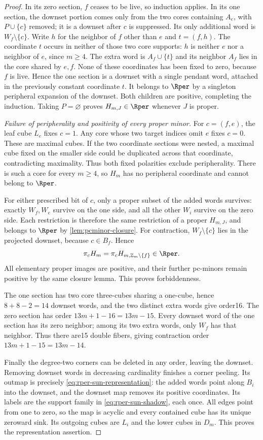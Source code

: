 \begin{proof}
In its zero section, $f$ ceases to be live, so induction applies.
In its one section, the downset portion comes only from the two cores
containing $A_e$, with $P\cup\{c\}$ removed; it is a downset after
$c$ is suppressed. Its only additional word is $W_f\setminus\{c\}$.
Write $h$ for the neighbor of $f$ other than $e$ and $t=(f,h)$.
The coordinate $t$ occurs in neither of those two core supports: $h$ is
neither $e$ nor a neighbor of $e$, since $m\ge4$.
The extra word is $A_f\cup\{t\}$ and its neighbor $A_f$ lies in the
core shared by $e,f$. None of these coordinates has been fixed to zero,
because $f$ is live. Hence the one section is a downset with a single
pendant word, attached in the previously constant coordinate $t$.
It belongs to $\Rper$ by a singleton peripheral expansion of the
downset. Both children are positive, completing the induction.
Taking $P=\varnothing$ proves $H_{m,J}\in\Rper$ whenever $J$ is proper.

\emph{Failure of peripherality and positivity of every proper minor.}
For $c=(f,e)$, the leaf cube $L_e$ fixes $c=1$. Any core whose two target
indices omit $e$ fixes $c=0$. These are maximal cubes.
If the two coordinate sections were nested, a maximal cube fixed on
the smaller side could be duplicated across that coordinate, contradicting
maximality. Thus both fixed polarities exclude peripherality.
There is such a core for every $m\ge4$, so $H_m$ has no peripheral
coordinate and cannot belong to $\Rper$.

For either prescribed bit of $c$, only a proper subset of the added
words survives: exactly $W_f,W_e$ survive on the one side, and all the
other $W_i$ survive on the zero side. Each restriction is therefore the
same restriction of a proper $H_{m,J}$, and belongs to $\Rper$ by
\cref{lem:pcminor-closure}.
For contraction, $W_f\setminus\{c\}$ lies in the projected downset,
because $c\in B_f$. Hence
\[
 \pi_c H_m=\pi_c H_{m,\mathbb Z_m\setminus\{f\}}\in\Rper.
\]
All elementary proper images are positive, and their further pc-minors
remain positive by the same closure lemma. This proves forbiddenness.

The one section has two core three-cubes sharing a one-cube, hence
$8+8-2=14$ downset words, and the two distinct extra words give order16.
The zero section has order $13m+1-16=13m-15$.
Every downset word of the one section has its zero neighbor; among its
two extra words, only $W_f$ has that neighbor. Thus there are15 double
fibers, giving contraction order $13m+1-15=13m-14$.

Finally the degree-two corners can be deleted in any order, leaving the
downset. Removing downset words in decreasing cardinality finishes a
corner peeling. Its outmap is precisely \eqref{eq:rper-sun-representation}:
the added words point along $B_i$ into the downset, and the downset map
removes its positive coordinates. Its labels are the support family in
\eqref{eq:rper-sun-shadow}, each once. All edges point from one to zero,
so the map is acyclic and every contained cube has its unique zeroward
sink. Its outgoing cubes are $L_i$ and the lower cubes in $D_m$.
This proves the representation assertion.
\end{proof}

